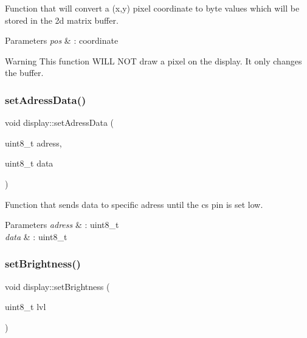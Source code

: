 Function that will convert a (x,y) pixel coordinate to byte values which will be stored in the 2d matrix buffer. 


\begin{DoxyParams}{Parameters}
{\em pos} & \+: coordinate \\
\hline
\end{DoxyParams}
\begin{DoxyWarning}{Warning}
This function W\+I\+LL N\+OT draw a pixel on the display. It only changes the buffer. 
\end{DoxyWarning}
\mbox{\label{classdisplay_a0c59879dfb0edeeca81c34d23cdde404}} 
\subsubsection{\texorpdfstring{set\+Adress\+Data()}{setAdressData()}}
{\footnotesize\ttfamily void display\+::set\+Adress\+Data (\begin{DoxyParamCaption}\item[{uint8\+\_\+t}]{adress,  }\item[{uint8\+\_\+t}]{data }\end{DoxyParamCaption})}



Function that sends data to specific adress until the cs pin is set low. 


\begin{DoxyParams}{Parameters}
{\em adress} & \+: uint8\+\_\+t \\
\hline
{\em data} & \+: uint8\+\_\+t \\
\hline
\end{DoxyParams}
\mbox{\label{classdisplay_aca4c200063dafafec86cc12d3ca6f2ad}} 
\subsubsection{\texorpdfstring{set\+Brightness()}{setBrightness()}}
{\footnotesize\ttfamily void display\+::set\+Brightness (\begin{DoxyParamCaption}\item[{uint8\+\_\+t}]{lvl }\end{DoxyParamCaption})}



